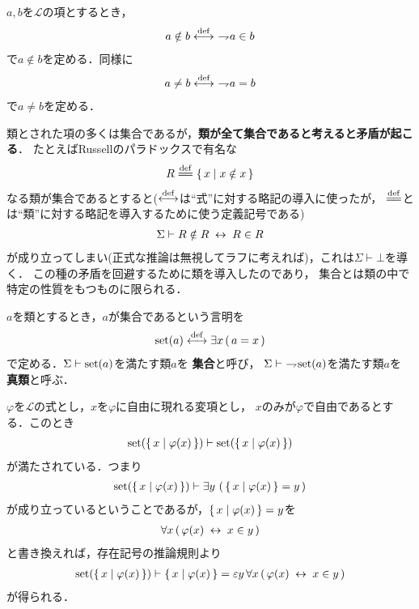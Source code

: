 	$a,b$を$\mathcal{L}$の項とするとき，
	\begin{align}
		a \notin b \overset{\mathrm{def}}{\longleftrightarrow}\ \rightharpoondown\hspace{-0.25em} a \in b
	\end{align}
	で$a \notin b$を定める．同様に
	\begin{align}
		a \neq b \overset{\mathrm{def}}{\longleftrightarrow}\ \rightharpoondown\hspace{-0.25em} a = b
	\end{align}
	で$a \neq b$を定める．
	
	類とされた項の多くは集合であるが，{\bf 類が全て集合であると考えると矛盾が起こる}．
	たとえばRussellのパラドックスで有名な
	\begin{align}
		R \defeq \Set{x}{x \notin x}
	\end{align}
	なる類が集合であるとすると($\overset{\mathrm{def}}{\longleftrightarrow}$は``式''に対する略記の導入に使ったが，
	$\defeq$とは``類''に対する略記を導入するために使う定義記号である)
	\begin{align}
		\Sigma \vdash R \notin R \hspace{0.25em}\leftrightarrow\hspace{0.25em} R \in R
	\end{align}
	が成り立ってしまい(正式な推論は無視してラフに考えれば)，これは$\Sigma \vdash \bot$を導く．
	この種の矛盾を回避するために類を導入したのであり，
	集合とは類の中で特定の性質をもつものに限られる．
	
	\begin{screen}
		\begin{dfn}[集合]
			$a$を類とするとき，$a$が集合であるという言明を
			\begin{align}
				\operatorname*{set} (a) \overset{\mathrm{def}}{\longleftrightarrow} \exists x\, (\, a = x\, )
			\end{align}
			で定める．$\Sigma \vdash \operatorname*{set} (a)$を満たす類$a$を
			{\bf 集合}と呼び，
			$\Sigma \vdash\ \rightharpoondown\hspace{-0.25em} \operatorname*{set} (a)$を満たす類$a$を
			{\bf 真類}と呼ぶ．
		\end{dfn}
	\end{screen}
	
	$\varphi$を$\mathcal{L}$の式とし，$x$を$\varphi$に自由に現れる変項とし，
	$x$のみが$\varphi$で自由であるとする．このとき
	\begin{align}
		\operatorname*{set} (\left\{\, x \mid \varphi(x)\, \right\}) \vdash \operatorname*{set} (\left\{\, x \mid \varphi(x)\, \right\})
	\end{align}
	が満たされている．つまり
	\begin{align}
		\operatorname*{set} (\left\{\, x \mid \varphi(x)\, \right\})
		\vdash \exists y\, \left(\, \left\{\, x \mid \varphi(x)\, \right\} = y\, \right)
	\end{align}
	が成り立っているということであるが，$\left\{\, x \mid \varphi(x)\, \right\} = y$を
	\begin{align}
		\forall x\, (\, \varphi(x) \hspace{0.25em}\leftrightarrow\hspace{0.25em} x \in y\, )
	\end{align}
	と書き換えれば，存在記号の推論規則より
	\begin{align}
		\operatorname*{set} (\left\{\, x \mid \varphi(x)\, \right\}) \vdash \left\{\, x \mid \varphi(x)\, \right\} = 
		\varepsilon y\, \forall x\, (\, \varphi(x) \hspace{0.25em}\leftrightarrow\hspace{0.25em} x \in y\, )
	\end{align}
	が得られる．
	
